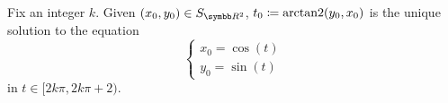 \begin{proposition}\label{thm:arctantwo}
  Fix an integer \( k \). Given \( (x_0, y_0) \in S_{\BR^2} \), \( t_0 \coloneqq \operatorname{arctan2}(y_0, x_0) \) is the unique solution to the equation
  \begin{equation}\label{thm:arctantwo/equation}
    \begin{cases}
      x_0 = \cos(t) \\
      y_0 = \sin(t)
    \end{cases}
  \end{equation}
  in \( t \in [2k\pi, 2k\pi + 2) \).
\end{proposition}
